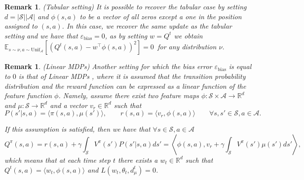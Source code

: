 \documentclass[a4paper,12pt]{article}
\newtheorem{remark}[theorem]{Remark}
\numberwithin{theorem}{section}
\newcommand\E{\mathbb{E}}
\newcommand\A{\mathcal{A}}
\newcommand\R{\mathbb{R}}
\renewcommand\S{\mathcal{S}}
\newcommand\1{\mathbf{1}}
\begin{document}
\begin{remark} (Tabular setting)
	It is possible to recover the tabular case by setting $d = |\S||\A|$ and $\phi(s,a)$ to be a vector of all zeros except a one in the position assigned to $(s,a)$. In this case, we recover the same update as the tabular setting and we have that $\varepsilon_\text{bias} = 0$, as by setting $w = Q^t$ we obtain $\E_{s\sim \nu, a\sim \text{Unif}_\A}\left[\left(Q^t (s,a)-  w^\top \phi(s,a)\right)^2\right] = 0\,$ for any distribution $\nu$.
\end{remark}
\begin{remark} (Linear MDPs)
	Another setting for which the bias error $\varepsilon_\text{bias}$ is equal to $0$ is that of Linear MDPs \citep{RN162}, where it is assumed that the transition probability distribution and the reward function can be expressed as a linear function of the feature function $\phi$. Namely, assume there exist two feature maps $\phi:\S\times\A\rightarrow\R^d$ and $\mu:\S\rightarrow\R^d$ and a vector $v_r\in\R^d$ such that
	\[P(s'|s,a)=\langle\pi(s,a),\mu(s')\rangle,\qquad r(s,a) = \langle v_r, \phi(s,a)\rangle\qquad\forall s,s'\in\S,a\in\A.\]

	If this assumption is satisfied, then we have that $\forall s\in\S,a\in\A$
	\[Q^\pi(s,a) = r(s,a) + \gamma\int_\S V^\pi(s')P(s'|s,a)ds' = \left\langle\phi(s,a),v_r + \gamma\int_\S V^\pi(s')\mu(s')ds'\right\rangle,\]
	which means that at each time step $t$ there exists a $w_t\in\R^d$ such that $Q^t(s,a) = \langle w_t,\phi(s,a)\rangle$ and $L(w_t,\theta_t,d^t_\mu) = 0$.
\end{remark}
\end{document}

